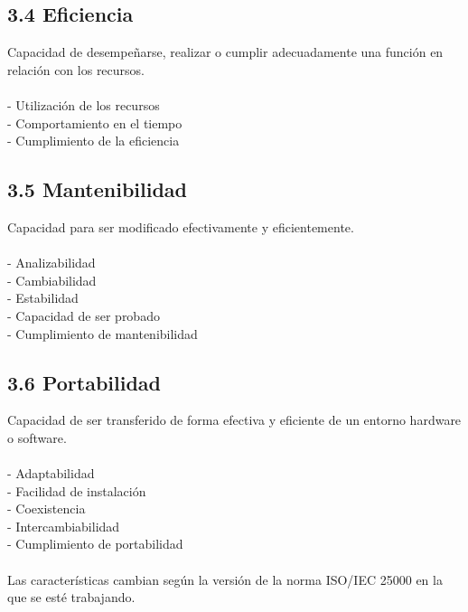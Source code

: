 \documentclass[https://www.overleaf.com/project/63761df255a8a9f4a15c3579
	letterpaper, %
	10pt, %
]{CSUniSchoolLabReport}
\begin{document}
        \subsection*{3.4 \hspace{0.5em} Eficiencia}
            Capacidad de desempeñarse, realizar o cumplir adecuadamente una función en relación con los recursos.
            \\\\
            - Utilización de los recursos
            \\
            - Comportamiento en el tiempo
            \\
            - Cumplimiento de la eficiencia

        \subsection*{3.5 \hspace{0.5em} Mantenibilidad}
            Capacidad para ser modificado efectivamente y eficientemente.
            \\\\
            - Analizabilidad
            \\
            - Cambiabilidad
            \\
            - Estabilidad
            \\
            - Capacidad de ser probado
            \\
            - Cumplimiento de mantenibilidad

        \subsection*{3.6 \hspace{0.5em} Portabilidad}
            Capacidad de ser transferido de forma efectiva y eficiente de un entorno hardware o software.
            \\\\
            - Adaptabilidad
            \\
            - Facilidad de instalación
            \\
            - Coexistencia
            \\
            - Intercambiabilidad
            \\
            - Cumplimiento de portabilidad
        \\\\
        Las características cambian según la versión de la norma ISO/IEC 25000 en la que se esté trabajando.
\end{document}
